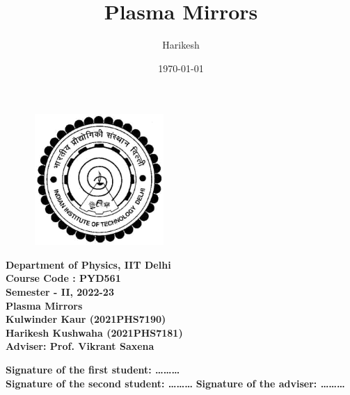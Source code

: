 \documentclass[12pt]{article}
\title{Plasma Mirrors}
\author{Harikesh}
\date{\today}
\newenvironment{changemargin}[2]{
\begin{list}{}{
\setlength{\topsep}{0pt}
\setlength{\leftmargin}{#1}
\setlength{\rightmargin}{#2}
\setlength{\listparindent}{\parindent}
\setlength{\itemindent}{\parindent}
\setlength{\parsep}{\parskip}
}
\item[]}{\end{list}}
\begin{document}
\begin{titlepage}
    \begin{figure}
        \includegraphics[width=5cm, height=5cm]{logo.png}
        \centering
    \end{figure}
    \begin{center}
        \textbf{\Large{Department of Physics, IIT Delhi}}\\
        \vspace*{1cm}
        \textbf{\Large{Course Code : PYD561}}\\
        \vspace*{0.2cm}
        \textbf{\Large {Semester - II, 2022-23}}\\
        \vspace*{1cm}
        \textbf{\LARGE{Plasma Mirrors}}\\
        \vspace*{1cm}
        \textbf{\Large{Kulwinder Kaur (2021PHS7190)}}\\
        \vspace*{0.2cm}
        \textbf{\Large {Harikesh Kushwaha (2021PHS7181)}}\\
        \vspace*{1cm}
        \textbf{\Large {Adviser: Prof. Vikrant Saxena}}\\
        \vspace*{2cm}
    \end{center}
    \begin{flushleft}
        \textbf{Signature of the first student: \ldots \ldots \ldots}\\
        \vspace*{1cm}
        \textbf{Signature of the second student: \ldots \ldots \ldots}
        \hspace*{2cm}
        \textbf{Signature of the adviser: \ldots \ldots \ldots}
    \end{flushleft}
\end{titlepage}
\newpage
\end{document}
